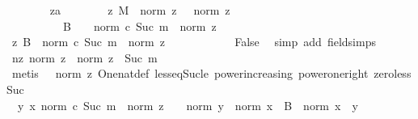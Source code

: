 \begin{isabellebody}
\ \ \ \ \ \ \isamarkupfalse%
\ z{\isacharcolon}{\kern0pt}{\isacharcolon}{\kern0pt}{\isacharprime}{\kern0pt}a\isanewline
\ \ \ \ \ \ \isamarkupfalse%
\ z{}{\isacharcolon}{\kern0pt}\ {\isachardoublequoteopen}M\ {\isasymle}\ norm\ z{\isachardoublequoteclose}\ {\isachardoublequoteopen}{}\ {\isasymle}\ norm\ z{\isachardoublequoteclose}\isanewline
\ \ \ \ \ \ \ \ \ \ {\isachardoublequoteopen}{\isasymbar}B{\isasymbar}\ {\isacharasterisk}{\kern0pt}\ {}\ {\isacharslash}{\kern0pt}\ norm\ {\isacharparenleft}{\kern0pt}c\ {\isacharparenleft}{\kern0pt}Suc\ m{\isacharparenright}{\kern0pt}{\isacharparenright}{\kern0pt}\ {\isasymle}\ norm\ z{\isachardoublequoteclose}\isanewline
\ \ \ \ \ \ \isamarkupfalse%
\ \isamarkupfalse%
\ z{}{\isacharcolon}{\kern0pt}\ {\isachardoublequoteopen}{\isasymbar}B{\isasymbar}\ {\isasymle}\ norm\ {\isacharparenleft}{\kern0pt}c\ {\isacharparenleft}{\kern0pt}Suc\ m{\isacharparenright}{\kern0pt}{\isacharparenright}{\kern0pt}\ {\isacharasterisk}{\kern0pt}\ norm\ z\ {\isacharslash}{\kern0pt}\ {}{\isachardoublequoteclose}\isanewline
\ \ \ \ \ \ \ \ \isamarkupfalse%
\ False\ \isamarkupfalse%
\ {\isacharparenleft}{\kern0pt}simp\ add{\isacharcolon}{\kern0pt}\ field{\isacharunderscore}{\kern0pt}simps{\isacharparenright}{\kern0pt}\isanewline
\ \ \ \ \ \ \isamarkupfalse%
\ nz{\isacharcolon}{\kern0pt}\ {\isachardoublequoteopen}norm\ z\ {\isasymle}\ norm\ z\ {\isacharcircum}{\kern0pt}\ Suc\ m{\isachardoublequoteclose}\isanewline
\ \ \ \ \ \ \ \ \isamarkupfalse%
\ {\isacharparenleft}{\kern0pt}metis\ {\isacartoucheopen}{}\ {\isasymle}\ norm\ z{\isacartoucheclose}\ One{\isacharunderscore}{\kern0pt}nat{\isacharunderscore}{\kern0pt}def\ less{\isacharunderscore}{\kern0pt}eq{\isacharunderscore}{\kern0pt}Suc{\isacharunderscore}{\kern0pt}le\ power{\isacharunderscore}{\kern0pt}increasing\ power{\isacharunderscore}{\kern0pt}one{\isacharunderscore}{\kern0pt}right\ zero{\isacharunderscore}{\kern0pt}less{\isacharunderscore}{\kern0pt}Suc{\isacharparenright}{\kern0pt}\isanewline
\ \ \ \ \ \ \isamarkupfalse%
\ {\isacharasterisk}{\kern0pt}{\isacharcolon}{\kern0pt}\ {\isachardoublequoteopen}{\isasymAnd}y\ x{\isachardot}{\kern0pt}\ norm\ {\isacharparenleft}{\kern0pt}c\ {\isacharparenleft}{\kern0pt}Suc\ m{\isacharparenright}{\kern0pt}{\isacharparenright}{\kern0pt}\ {\isacharasterisk}{\kern0pt}\ norm\ z\ {\isacharslash}{\kern0pt}\ {}\ {\isasymle}\ norm\ y\ {\isacharminus}{\kern0pt}\ norm\ x\ {\isasymLongrightarrow}\ B\ {\isasymle}\ norm\ {\isacharparenleft}{\kern0pt}x\ {\isacharplus}{\kern0pt}\ y{\isacharparenright}{\kern0pt}{\isachardoublequoteclose}\isanewline

\end{isabellebody}
